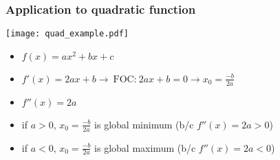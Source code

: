\documentclass[xcolor=dvipsnames]{beamer} %
\begin{document}

\begin{frame}
\frametitle{Application to quadratic function}
\begin{center}
\texttt{[image: quad\_example.pdf]}
\end{center}
\vspace{-1em}
\begin{scriptsize}
\begin{itemize}
    \setlength\itemsep{1em}

\item $f(x) = ax^2 + bx + c$
\item $f'(x) = 2ax + b \rightarrow ~\textrm{FOC:}~2ax + b = 0 \rightarrow x_0 = \frac{-b}{2a}$
\item $f''(x) = 2a$
\item if $a > 0$, $x_0 = \frac{-b}{2a}$ is global minimum (b/c $f''(x) = 2a >0$)
\item if $a < 0$, $x_0 = \frac{-b}{2a}$ is global maximum (b/c $f''(x) = 2a <0$)
\end{itemize}
\end{scriptsize}
\end{frame}
\end{document}
